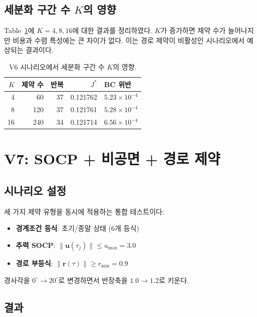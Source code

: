 \documentclass[11pt]{article}
\begin{document}
\subsection{세분화 구간 수 $K$의 영향}

Table~\ref{tab:K_effect}에 $K = 4, 8, 16$에 대한 결과를 정리하였다.
$K$가 증가하면 제약 수가 늘어나지만 비용과 수렴 특성에는 큰 차이가 없다.
이는 경로 제약이 비활성인 시나리오에서 예상되는 결과이다.

\begin{table}[h]
\centering
\caption{V6 시나리오에서 세분화 구간 수 $K$의 영향.}
\label{tab:K_effect}
\begin{tabular}{rrrrl}
\toprule
$K$ & 제약 수 & 반복 & $J^*$ & BC 위반 \\
\midrule
4  & 60  & 37 & 0.121762 & $5.23 \times 10^{-4}$ \\
8  & 120 & 37 & 0.121761 & $5.28 \times 10^{-4}$ \\
16 & 240 & 34 & 0.121714 & $6.56 \times 10^{-4}$ \\
\bottomrule
\end{tabular}
\end{table}

\section{V7: SOCP + 비공면 + 경로 제약}

\subsection{시나리오 설정}

세 가지 제약 유형을 동시에 적용하는 통합 테스트이다:
\begin{itemize}
  \item \textbf{경계조건 등식}: 초기/종말 상태 (6개 등식)
  \item \textbf{추력 SOCP}: $\|\mathbf{u}(\tau_j)\| \le u_{\max} = 3.0$
  \item \textbf{경로 부등식}: $\|\mathbf{r}(\tau)\| \ge r_{\min} = 0.9$
\end{itemize}
경사각을 $0^\circ \to 20^\circ$로 변경하면서 반장축을 $1.0 \to 1.2$로 키운다.

\subsection{결과}
\end{document}
